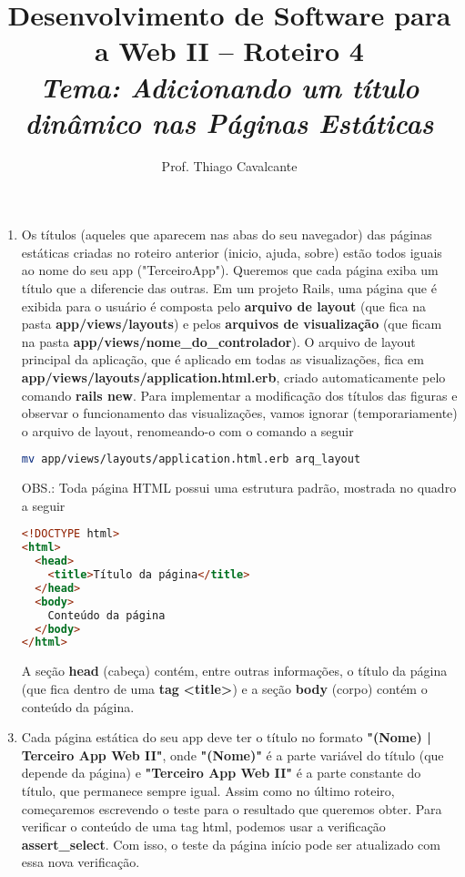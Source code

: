 \documentclass[a4paper,12pt]{article}
\title{Desenvolvimento de Software para a Web II -- Roteiro 4 \\
\Large \textit{Tema: Adicionando um título dinâmico nas Páginas Estáticas}}
\author{Prof. Thiago Cavalcante}
\date{}
\begin{document}
\maketitle

\sloppy
\raggedright

\begin{enumerate}
  \item Os títulos (aqueles que aparecem nas abas do seu navegador) das páginas estáticas criadas no roteiro anterior (inicio, ajuda, sobre) estão todos iguais ao nome do seu app ("TerceiroApp"). Queremos que cada página exiba um título que a diferencie das outras. Em um projeto Rails, uma página que é exibida para o usuário é composta pelo \textbf{arquivo de layout} (que fica na pasta \textbf{app/views/layouts}) e pelos \textbf{arquivos de visualização} (que ficam na pasta \textbf{app/views/nome\_do\_controlador}). O arquivo de layout principal da aplicação, que é aplicado em todas as visualizações, fica em \textbf{app/views/layouts/application.html.erb}, criado automaticamente pelo comando \textbf{rails new}. Para implementar a modificação dos títulos das figuras e observar o funcionamento das visualizações, vamos ignorar (temporariamente) o arquivo de layout, renomeando-o com o comando a seguir

  \begin{lstlisting}[language=Bash, title={terminal, dentro da pasta do terceiro app}]
mv app/views/layouts/application.html.erb arq_layout
  \end{lstlisting}

  \pagebreak

  \item [OBS.:] Toda página HTML possui uma estrutura padrão, mostrada no quadro a seguir

  \begin{lstlisting}[language=html]
<!DOCTYPE html>
<html>
  <head>
    <title>Título da página</title>
  </head>
  <body>
    Conteúdo da página
  </body>
</html>
  \end{lstlisting}

  A seção \textbf{head} (cabeça) contém, entre outras informações, o título da página (que fica dentro de uma \textbf{tag} \textbf{<title>}) e a seção \textbf{body} (corpo) contém o conteúdo da página.

  \item Cada página estática do seu app deve ter o título no formato \textbf{"{}(Nome) | Terceiro App Web II"}, onde \textbf{"(Nome)"} é a parte variável do título (que depende da página) e \textbf{"Terceiro App Web II"} é a parte constante do título, que permanece sempre igual. Assim como no último roteiro, começaremos escrevendo o teste para o resultado que queremos obter. Para verificar o conteúdo de uma tag html, podemos usar a verificação \textbf{assert\_select}. Com isso, o teste da página início pode ser atualizado com essa nova verificação.


\end{enumerate}
\end{document}
